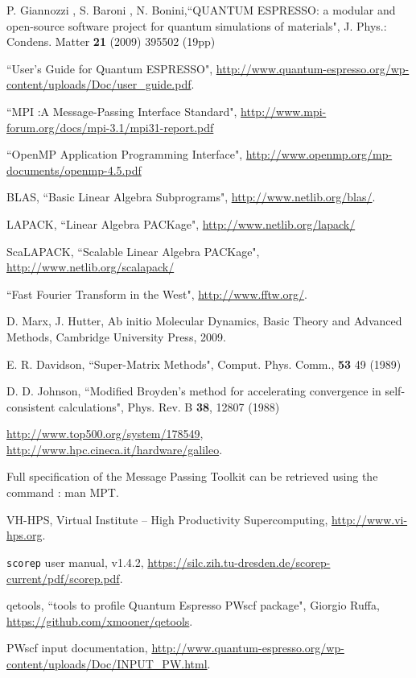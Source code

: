 \documentclass[a4paper,12pt]{article}
\begin{document}
\begin{thebibliography}{9}
P. Giannozzi , S. Baroni , N. Bonini,``QUANTUM ESPRESSO: a modular and open-source software project for quantum simulations of materials", J. Phys.: Condens. Matter \textbf{21} (2009) 395502 (19pp)

``User's Guide for Quantum ESPRESSO", \url{http://www.quantum-espresso.org/wp-content/uploads/Doc/user_guide.pdf}.

``MPI :A Message-Passing Interface Standard", \url{http://www.mpi-forum.org/docs/mpi-3.1/mpi31-report.pdf}

``OpenMP Application Programming Interface", \url{http://www.openmp.org/mp-documents/openmp-4.5.pdf}

BLAS, ``Basic Linear Algebra Subprograms", \url{http://www.netlib.org/blas/}.

LAPACK, ``Linear Algebra PACKage", \url{http://www.netlib.org/lapack/}

ScaLAPACK, ``Scalable Linear Algebra PACKage", \url{http://www.netlib.org/scalapack/}

``Fast Fourier Transform in the West", \url{http://www.fftw.org/}.


D. Marx, J. Hutter,
Ab initio Molecular Dynamics,
Basic Theory and Advanced Methods,
Cambridge University Press,
2009.

E. R. Davidson, ``Super-Matrix Methods", Comput. Phys. Comm., \textbf{53} 49 (1989)

D. D. Johnson, ``Modified Broyden’s method for accelerating convergence in self-consistent calculations", Phys. Rev. B \textbf{38}, 12807 (1988)

\url{http://www.top500.org/system/178549},
\url{http://www.hpc.cineca.it/hardware/galileo}.

Full specification of the Message Passing Toolkit can be retrieved using the command : man MPT.

VH-HPS, 
Virtual Institute – High Productivity Supercomputing, 
\url{http://www.vi-hps.org}.

\texttt{scorep} user manual, 
v1.4.2,
\url{https://silc.zih.tu-dresden.de/scorep-current/pdf/scorep.pdf}.

qetools, ``tools to profile Quantum Espresso PWscf package", Giorgio Ruffa, \url{https://github.com/xmooner/qetools}.

PWscf input documentation, \url{http://www.quantum-espresso.org/wp-content/uploads/Doc/INPUT_PW.html}.


\end{thebibliography}
\end{document}
